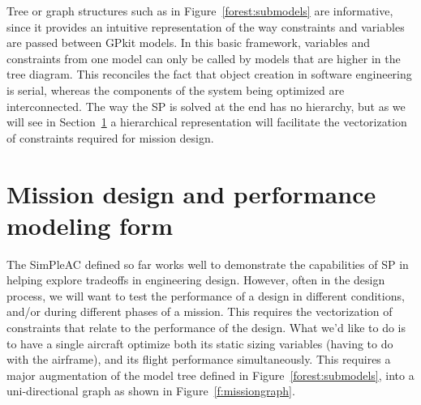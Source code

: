Tree or graph structures such as in Figure~\ref{forest:submodels} are informative, since
it provides an intuitive representation of the way constraints and variables
are passed between GPkit models. In this basic framework,
variables and constraints from one model can only be called by models that are higher in
the tree diagram. This reconciles the fact that object creation in software engineering is serial, whereas
the components of the system being optimized are interconnected. The way the \gls{SP} is solved at the end has no
hierarchy, but as we will see in Section~\ref{s:mission} a hierarchical representation
will facilitate the vectorization of constraints required for mission design.


\section{Mission design and performance modeling form}
\label{s:mission}

The SimPleAC defined so far works well to demonstrate the
capabilities of \gls{SP} in helping explore tradeoffs in engineering design.
However, often in the design process, we will want to test the performance of a
design in different conditions, and/or during different phases of a mission.
This requires the vectorization of
constraints that relate to the performance of the design. What we'd like to do
is to have a single aircraft optimize both its static sizing variables (having
to do with the airframe), and its flight performance simultaneously. This requires a major
augmentation of the model tree defined in Figure~\ref{forest:submodels}, into a
uni-directional graph as shown in Figure~\ref{f:missiongraph}.

